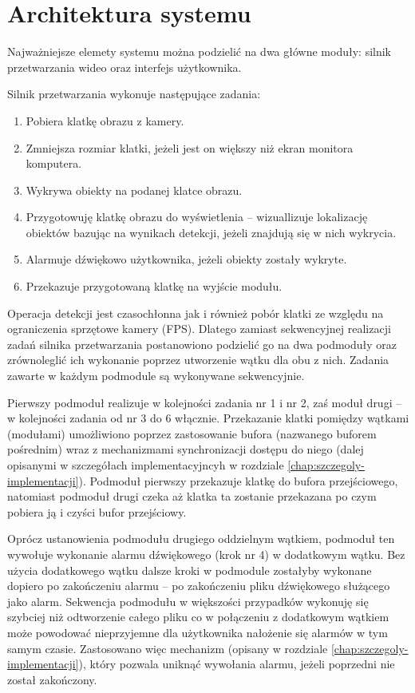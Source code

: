 \section{Architektura systemu}
\label{chap:architektura}
Najważniejsze elemety systemu można podzielić na dwa główne moduły: silnik przetwarzania wideo oraz interfejs użytkownika. 

Silnik przetwarzania wykonuje następujące zadania:
\begin{enumerate}
    \item Pobiera klatkę obrazu z kamery.
    \item Zmniejsza rozmiar klatki, jeżeli jest on większy niż ekran monitora komputera.
    \item Wykrywa obiekty na podanej klatce obrazu.
    \item Przygotowuję klatkę obrazu do wyświetlenia -- wizuallizuje lokalizację obiektów bazując na wynikach detekcji, jeżeli znajdują się w nich wykrycia.
    \item Alarmuje dźwiękowo użytkownika, jeżeli obiekty zostały wykryte.
    \item Przekazuje przygotowaną klatkę na wyjście modułu. 
\end{enumerate}

Operacja detekcji jest czasochłonna jak i również pobór klatki ze względu na ograniczenia sprzętowe kamery (FPS). Dlatego zamiast sekwencyjnej realizacji zadań silnika przetwarzania postanowiono podzielić go na dwa podmoduły oraz zrównoleglić ich wykonanie poprzez utworzenie wątku dla obu z nich. Zadania zawarte w każdym podmodule są wykonywane sekwencyjnie.

Pierwszy podmoduł realizuje w kolejności zadania nr 1 i nr 2, zaś moduł drugi -- w kolejności zadania od nr 3 do 6 włącznie. Przekazanie klatki pomiędzy wątkami (modułami) umożliwiono poprzez zastosowanie bufora (nazwanego buforem pośrednim) wraz z mechanizmami synchronizacji dostępu do niego (dalej opisanymi w szczegółach implementacyjncyh w rozdziale \ref{chap:szczegoly-implementacji}). Podmoduł pierwszy przekazuje klatkę do bufora przejściowego, natomiast podmoduł drugi czeka aż klatka ta zostanie przekazana po czym pobiera ją i czyści bufor przejściowy. 

Oprócz ustanowienia podmodułu drugiego oddzielnym wątkiem, podmoduł ten wywołuje wykonanie alarmu dźwiękowego (krok nr 4) w dodatkowym wątku. Bez użycia dodatkowego wątku dalsze kroki w podmodule zostałyby wykonane dopiero po zakończeniu alarmu -- po zakończeniu pliku dźwiękowego służącego jako alarm. Sekwencja podmodułu w większości przypadków wykonuję się szybciej niż odtworzenie całego pliku co w połączeniu z dodatkowym wątkiem może powodować nieprzyjemne dla użytkownika nałożenie się alarmów w tym samym czasie. Zastosowano więc mechanizm (opisany w rozdziale \ref{chap:szczegoly-implementacji}), który pozwala uniknąć wywołania alarmu, jeżeli poprzedni nie został zakończony.

